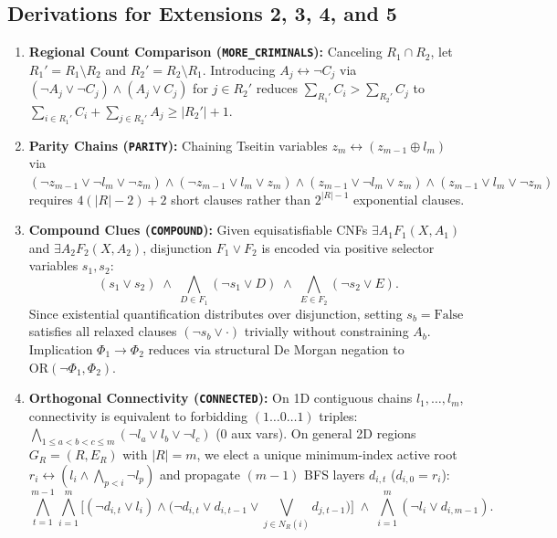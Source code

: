 \documentclass[11pt,a4paper]{article}
\begin{document}
\subsection{Derivations for Extensions 2, 3, 4, and 5}
\begin{enumerate}[nosep]
    \item \textbf{Regional Count Comparison (\texttt{MORE\_CRIMINALS}):} Canceling $R_1 \cap R_2$, let $R_1' = R_1 \setminus R_2$ and $R_2' = R_2 \setminus R_1$. Introducing $A_j \leftrightarrow \neg C_j$ via $(\neg A_j \lor \neg C_j) \land (A_j \lor C_j)$ for $j \in R_2'$ reduces $\sum_{R_1'} C_i > \sum_{R_2'} C_j$ to $\sum_{i \in R_1'} C_i + \sum_{j \in R_2'} A_j \ge |R_2'| + 1$.
    \item \textbf{Parity Chains (\texttt{PARITY}):} Chaining Tseitin variables $z_m \leftrightarrow (z_{m-1} \oplus l_m)$ via $(\neg z_{m-1} \lor \neg l_m \lor \neg z_m) \land (\neg z_{m-1} \lor l_m \lor z_m) \land (z_{m-1} \lor \neg l_m \lor z_m) \land (z_{m-1} \lor l_m \lor \neg z_m)$ requires $4(|R|-2)+2$ short clauses rather than $2^{|R|-1}$ exponential clauses.
    \item \textbf{Compound Clues (\texttt{COMPOUND}):} Given equisatisfiable CNFs $\exists A_1 F_1(X, A_1)$ and $\exists A_2 F_2(X, A_2)$, disjunction $F_1 \lor F_2$ is encoded via positive selector variables $s_1, s_2$:
    \[
    (s_1 \lor s_2) \;\land\; \bigwedge_{D \in F_1} (\neg s_1 \lor D) \;\land\; \bigwedge_{E \in F_2} (\neg s_2 \lor E).
    \]
    Since existential quantification distributes over disjunction, setting $s_b = \text{False}$ satisfies all relaxed clauses $(\neg s_b \lor \cdot)$ trivially without constraining $A_b$. Implication $\Phi_1 \to \Phi_2$ reduces via structural De Morgan negation to $\text{OR}(\neg \Phi_1, \Phi_2)$.
    \item \textbf{Orthogonal Connectivity (\texttt{CONNECTED}):} On 1D contiguous chains $l_1, \dots, l_m$, connectivity is equivalent to forbidding $(1 \dots 0 \dots 1)$ triples: $\bigwedge_{1 \le a < b < c \le m} (\neg l_a \lor l_b \lor \neg l_c)$ (0 aux vars). On general 2D regions $G_R = (R, E_R)$ with $|R|=m$, we elect a unique minimum-index active root $r_i \leftrightarrow (l_i \land \bigwedge_{p < i} \neg l_p)$ and propagate $(m-1)$ BFS layers $d_{i,t}$ ($d_{i,0} = r_i$):
    \[
    \bigwedge_{t=1}^{m-1} \bigwedge_{i=1}^m \Big[(\neg d_{i,t} \lor l_i) \land \big(\neg d_{i,t} \lor d_{i,t-1} \lor \bigvee_{j \in N_R(i)} d_{j,t-1}\big)\Big] \;\land\; \bigwedge_{i=1}^m (\neg l_i \lor d_{i,m-1}).
    \]
\end{enumerate}
\end{document}
